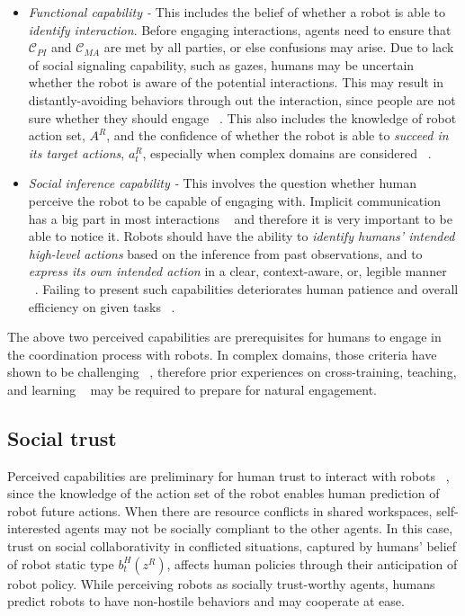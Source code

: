 \documentclass[letterpaper, 10 pt, conference]{ieeeconf}  %
\begin{document}
\begin{itemize}
	\item \textit{Functional capability - } This includes the belief of whether a robot is able to \textit{identify interaction}. Before engaging interactions, agents need to ensure that $\mathcal{C}_{PI}$ and $\mathcal{C}_{MA}$ are met by all parties, or else confusions may arise. Due to lack of social signaling capability, such as gazes, humans may be uncertain whether the robot is aware of the potential interactions. This may result in distantly-avoiding behaviors through out the interaction, since people are not sure whether they should engage ~\cite{dragan2015effects}. This also includes the knowledge of robot action set, $A^R$, and the confidence of whether the robot is able to \textit{succeed in its target actions}, $a^R_t$, especially when complex domains are considered ~\cite{chen2018planning}. 
	\item \textit{Social inference capability - } This involves the question whether human perceive the robot to be capable of engaging with. Implicit communication has a big part in most interactions ~\cite{knepper2017implicit} and therefore it is very important to be able to notice it. Robots should have the ability to \textit{identify humans' intended high-level actions} based on the inference from past observations, and to \textit{express its own intended action} in a clear, context-aware, or, legible manner ~\cite{dragan2013legibility}. Failing to present such capabilities deteriorates human patience and overall efficiency on given tasks ~\cite{cha2015perceived}. 
\end{itemize}

The above two perceived capabilities are prerequisites for humans to engage in the coordination process with robots. In complex domains, those criteria have shown to be challenging ~\cite{knepper2017implicit}, therefore prior experiences on cross-training, teaching, and learning ~\cite{zhang2017plan} may be required to prepare for natural engagement. 

\subsection{Social trust}%
Perceived capabilities are preliminary for human trust to interact with robots ~\cite{yang2017evaluating}, since the knowledge of the action set of the robot enables 
human prediction of robot future actions. When there are resource conflicts in shared workspaces, self-interested agents may not be socially compliant to the other agents. 
In this case, trust on social collaborativity in conflicted situations, captured by humans' belief of robot static type $b^H_t(z^R)$, affects human policies through their anticipation of robot policy. While perceiving robots as socially trust-worthy agents, humans predict robots to have non-hostile behaviors and may cooperate at ease.   
\end{document}
